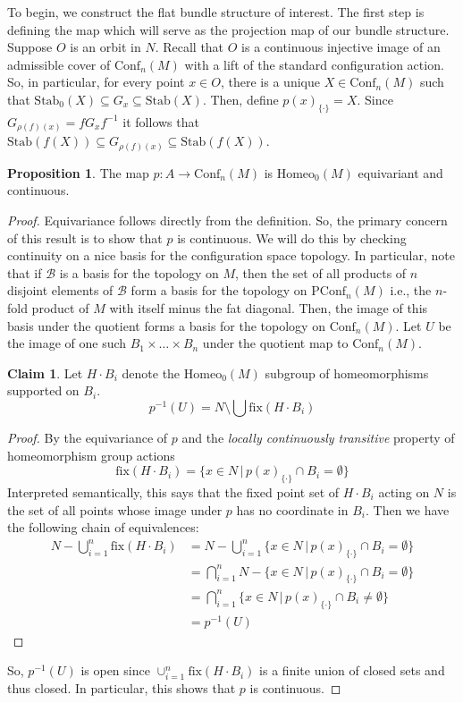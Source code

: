 \documentclass[10pt, oneside]{article}
\newcommand{\homeo}[1][S^1]{\text{Homeo}_0(#1)}
\newcommand{\conf}[2][S^1]{\text{Conf}_{#2}(#1)}
\newcommand{\pconf}[2][S^1]{\text{PConf}_{#2}(#1)}
\newcommand{\set}{{\{\cdot\}}}
\newcommand{\stab}[1]{\text{Stab}(#1)}
\newcommand{\pstab}[1]{\text{Stab}_0(#1)}
\theoremstyle{definition}
\newtheorem{prop}{Proposition}[section]
\newtheorem*{clm*}{Claim}
\theoremstyle{definition}
\begin{document}
To begin, we construct the flat bundle structure of interest. The first step is defining the map which will serve as the projection map of our bundle structure. Suppose $O$ is an orbit in $N$. 
Recall that $O$ is a continuous injective image 
of an admissible cover of $\conf[M]{n}$ 
with a lift of the standard configuration action. 
So, in particular, 
for every point $x\in O$, 
there is a unique $X\in\conf[M]{n}$ 
such that $\pstab{X} \subseteq G_x \subseteq \stab{X}$. 
Then, define $p(x)_\set = X$. 
Since $G_{\rho(f)(x)} = f G_x f^{-1}$ 
it follows that $\stab{f(X)} \subseteq G_{\rho(f)(x)}\subseteq \stab{f(X)}$. 

\begin{prop}
    The map $p: A\to \conf[M]{n}$ is $\homeo[M]$ equivariant and continuous.
\end{prop}
\begin{proof}
    Equivariance follows directly from the definition.
    So, the primary concern of this result is to show that $p$ is continuous.
    We will do this by checking continuity on a nice basis for the configuration space topology. 
    In particular, 
    note that if $\mathscr{B}$ is a basis for the topology on $M$, 
    then the set of all products of $n$ disjoint elements of $\mathscr{B}$ form a basis for the topology on $\pconf[M]{n}$ 
    i.e., the $n$-fold product of $M$ with itself minus the fat diagonal. 
    Then, the image of this basis under the quotient forms a basis for the topology on $\conf[M]{n}$.
    Let $U$ be the image of one such $B_1\times\dots\times B_n$ 
    under the quotient map to $\conf[M]{n}$. 

    \begin{clm*}
        Let $H\cdot B_i$ denote the $\homeo[M]$ subgroup of homeomorphisms supported on $B_i$.
        $$p^{-1}(U) = N \setminus \bigcup \text{fix}(H\cdot B_i)$$
    \end{clm*}
    \begin{proof}
        By the equivariance of $p$ 
        and the \textit{locally continuously transitive} property of homeomorphism group actions
        $$\text{fix}(H\cdot B_i) = \{x\in N\, |\, p(x)_\set\cap B_i = \emptyset\}$$
        Interpreted semantically,
        this says that 
        the fixed point set of $H\cdot B_i$ acting on $N$ is 
        the set of all points whose image under $p$ has no coordinate in $B_i$. 
        Then we have the following chain of equivalences:
        \begin{align*}
            N - \bigcup_{i=1}^n\text{fix}(H\cdot B_i) &= N - \bigcup_{i=1}^n\{x\in N\, |\, p(x)_\set\cap B_i = \emptyset\}\\
            &= \bigcap_{i=1}^n N - \{x\in N\, |\, p(x)_\set\cap B_i = \emptyset\}\\
            &= \bigcap_{i=1}^n \{x\in N\, |\, p(x)_\set\cap B_i \neq \emptyset\}\\
            &= p^{-1}(U)
        \end{align*}
    \end{proof}
    So,
    $p^{-1}(U)$ is open
    since $\cup_{i=1}^n\text{fix}(H\cdot B_i)$ is a finite union of closed sets
    and thus closed.
    In particular,
    this shows that $p$ is continuous.
\end{proof}
\end{document}
